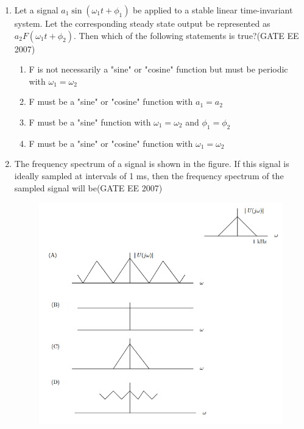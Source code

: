 \documentclass[a4paper,10pt]{exam}
\theoremstyle{remark}
\begin{document}
\begin{enumerate}
\vspace{1cm}

\item  Let a signal $ a_1 \sin(\omega_1 t + \phi_1)$ be applied to a stable linear time-invariant system. Let the corresponding steady state output be represented as $ a_2 F(\omega_1 t + \phi_2) $. Then which of the following statements is true?\hfill{(GATE EE 2007)} 
\begin{enumerate}
\item  F is not necessarily a "sine" or "cosine" function but must be periodic with $\omega_1= \omega_2$
\item  F must be a "sine" or "cosine" function with $a_1=a_2$
\item  F must be a "sine" function with $\omega_1= \omega_2$ and   $\phi_1 = \phi_2$
\item  F must be a "sine" or "cosine" function with $\omega_1=\omega_2$
\end{enumerate}

\vspace{0.5cm}

\newpage

\item  The frequency spectrum of a signal is shown in the figure. If this signal is ideally sampled at intervals of 1 ms, then the frequency spectrum of the sampled signal will be\hfill{(GATE EE 2007)} 

\begin{figure}[H]
    \centering
    \includegraphics[width=0.75\linewidth]{figs/Q 10.png} \caption{}     \label{fig:myfigure}
    
\end{figure}


\end{enumerate}
\end{document}
